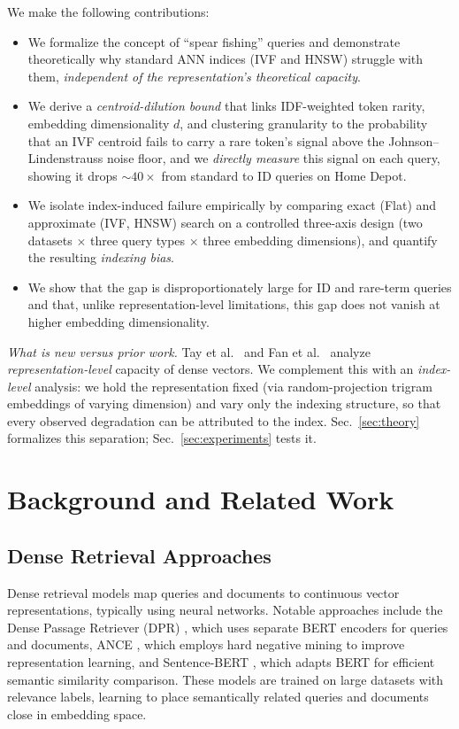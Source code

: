 \documentclass[conference]{IEEEtran}
\begin{document}
We make the following contributions:
\begin{itemize}
    \item We formalize the concept of ``spear fishing'' queries and demonstrate theoretically why standard ANN indices (IVF and HNSW) struggle with them, \emph{independent of the representation's theoretical capacity}.

    \item We derive a \emph{centroid-dilution bound} that links IDF-weighted token rarity, embedding dimensionality $d$, and clustering granularity to the probability that an IVF centroid fails to carry a rare token's signal above the Johnson--Lindenstrauss noise floor, and we \emph{directly measure} this signal on each query, showing it drops $\sim\!40\times$ from standard to ID queries on Home Depot.

    \item We isolate index-induced failure empirically by comparing exact (Flat) and approximate (IVF, HNSW) search on a controlled three-axis design (two datasets $\times$ three query types $\times$ three embedding dimensions), and quantify the resulting \emph{indexing bias}.

    \item We show that the gap is disproportionately large for ID and rare-term queries and that, unlike representation-level limitations, this gap does not vanish at higher embedding dimensionality.
\end{itemize}

\noindent\textit{What is new versus prior work.} Tay et al.~\cite{tay2020sparse} and Fan et al.~\cite{fan2022information} analyze \emph{representation-level} capacity of dense vectors. We complement this with an \emph{index-level} analysis: we hold the representation fixed (via random-projection trigram embeddings of varying dimension) and vary only the indexing structure, so that every observed degradation can be attributed to the index. Sec.~\ref{sec:theory} formalizes this separation; Sec.~\ref{sec:experiments} tests it.

\section{Background and Related Work}

\subsection{Dense Retrieval Approaches}
Dense retrieval models map queries and documents to continuous vector representations, typically using neural networks. Notable approaches include the Dense Passage Retriever (DPR) \cite{karpukhin2020dense}, which uses separate BERT encoders for queries and documents, ANCE \cite{xiong2021approximate}, which employs hard negative mining to improve representation learning, and Sentence-BERT \cite{reimers2019sentencebert}, which adapts BERT for efficient semantic similarity comparison. These models are trained on large datasets with relevance labels, learning to place semantically related queries and documents close in embedding space.
\end{document}
